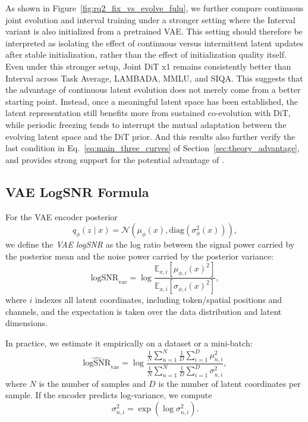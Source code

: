 As shown in Figure~\ref{fig:rq2_fix_vs_evolve_fulu}, we further compare continuous joint evolution and interval training under a stronger setting where the Interval variant is also initialized from a pretrained VAE. This setting should therefore be interpreted as isolating the effect of continuous versus intermittent latent updates after stable initialization, rather than the effect of initialization quality itself. Even under this stronger setup, Joint DiT x1 remains consistently better than Interval across Task Average, LAMBADA, MMLU, and SIQA. This suggests that the advantage of continuous latent evolution does not merely come from a better starting point. Instead, once a meaningful latent space has been established, the latent representation still benefits more from sustained co-evolution with DiT, while periodic freezing tends to interrupt the mutual adaptation between the evolving latent space and the DiT prior. And this results also further verify the last condition in Eq.~\eqref{eq:main_three_curves} of Section~\ref{sec:theory_advantage}, and provides strong support for the potential advantage of \method.

\subsection{VAE LogSNR Formula}
\label{app:vae_logsnr_calc}

For the VAE encoder posterior
\begin{equation}
q_{\phi}(z \mid x)=\mathcal{N}\!\left(\mu_{\phi}(x), \mathrm{diag}\!\left(\sigma_{\phi}^{2}(x)\right)\right),
\end{equation}
we define the \emph{VAE logSNR} as the log ratio between the signal power carried by the posterior mean and the noise power carried by the posterior variance:
\begin{equation}
\mathrm{logSNR}_{\mathrm{vae}}
=
\log
\frac{\mathbb{E}_{x,i}\!\left[\mu_{\phi,i}(x)^2\right]}
{\mathbb{E}_{x,i}\!\left[\sigma_{\phi,i}(x)^2\right]},
\label{eq:vae_logsnr_def}
\end{equation}
where \(i\) indexes all latent coordinates, including token/spatial positions and channels, and the expectation is taken over the data distribution and latent dimensions.

In practice, we estimate it empirically on a dataset or a mini-batch:
\begin{equation}
\widehat{\mathrm{logSNR}}_{\mathrm{vae}}
=
\log
\frac{
\frac{1}{N}\sum_{n=1}^{N}\frac{1}{D}\sum_{i=1}^{D}\mu_{n,i}^{2}
}{
\frac{1}{N}\sum_{n=1}^{N}\frac{1}{D}\sum_{i=1}^{D}\sigma_{n,i}^{2}
},
\label{eq:vae_logsnr_empirical}
\end{equation}
where \(N\) is the number of samples and \(D\) is the number of latent coordinates per sample. If the encoder predicts log-variance, we compute
\begin{equation}
\sigma_{n,i}^{2} = \exp\!\left(\log \sigma_{n,i}^{2}\right).
\end{equation}

